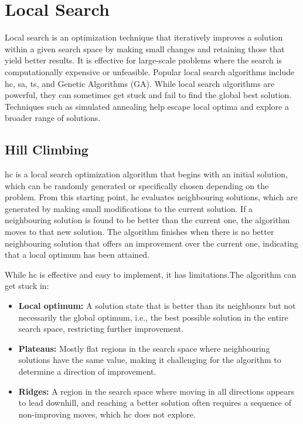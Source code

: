 \section{Local Search}

Local search is an optimization technique that iteratively improves a solution within a given search space by making small changes and retaining those that yield better results. It is effective for large-scale problems where the search is computationally expensive or unfeasible. Popular local search algorithms include \ac{hc}, \ac{sa}, \ac{ts}, and Genetic Algorithms (GA). While local search algorithms are powerful, they can sometimes get stuck and fail to find the global best solution. Techniques such as simulated annealing help escape local optima and explore a broader range of solutions.

\subsection{Hill Climbing}

\ac{hc} is a local search optimization algorithm that begins with an initial solution, which can be randomly generated or specifically chosen depending on the problem. From this starting point, \ac{hc} evaluates neighbouring solutions, which are generated by making small modifications to the current solution. If a neighbouring solution is found to be better than the current one, the algorithm moves to that new solution. The algorithm finishes when there is no better neighbouring solution that offers an improvement over the current one, indicating that a local optimum has been attained. 

While \ac{hc} is effective and easy to implement, it has limitations.The algorithm can get stuck in:

\begin{itemize}
\item \textbf{Local optimum:} A solution state that is better than its neighbours but not necessarily the global optimum, i.e., the best possible solution in the entire search space, restricting further improvement.
\item \textbf{Plateaus:} Mostly flat regions in the search space where neighbouring solutions have the same value, making it challenging for the algorithm to determine a direction of improvement.
\item \textbf{Ridges:} A region in the search space where moving in all directions appears to lead downhill, and reaching a better solution often requires a sequence of non-improving moves, which \ac{hc} does not explore.
\end{itemize}

